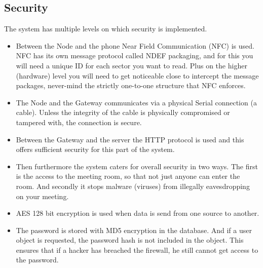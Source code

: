 \subsection{Security}
    The system has multiple levels on which security is implemented.
\begin{itemize}
    \item Between the Node and the phone Near Field Communication (NFC) is used. NFC has its own message protocol called NDEF packaging, and for this you will need a unique ID for each sector you want to read. Plus on the higher (hardware) level you will need to get noticeable close to intercept the message packages, never-mind the strictly one-to-one structure that NFC enforces. 
    \item The Node and the Gateway communicates via a physical Serial connection (a cable). Unless the integrity of the cable is physically compromised or tampered with, the connection is secure.
    \item Between the Gateway and the server the HTTP protocol is used and this offers sufficient security for this part of the system.
    \item Then furthermore the system caters for overall security in two ways. The first is the access to the meeting room, so that not just anyone can enter the room. And secondly it stops malware (viruses) from illegally eavesdropping on your meeting.
    \item AES 128 bit encryption is used when data is send from one source to another. 
    \item The password is stored with MD5 encryption in the database. And if a user object is requested, the password hash is not included in the object. This ensures that if a hacker has breached the firewall, he still cannot get access to the password.
\end{itemize}

